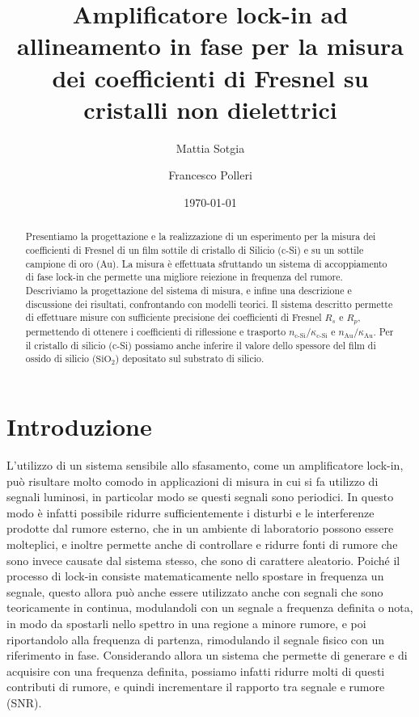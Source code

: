 \documentclass[prb,showpacs,floatfix,altaffilletter,amsmath,amssymb,reprint,citeautoscript,showkeys]{revtex4-1}
\begin{document}
\title{Amplificatore lock-in ad allineamento in fase per la misura dei coefficienti di Fresnel su cristalli non dielettrici}
\author{Mattia Sotgia}
\author{Francesco Polleri}
\date{\today}

\begin{abstract}
    Presentiamo la progettazione e la realizzazione di un esperimento per la misura dei coefficienti di Fresnel di un film sottile di cristallo di Silicio (c-Si) e su un sottile campione di oro (Au). La misura è effettuata sfruttando un sistema di accoppiamento di fase lock-in\cite{scofieldFrequencydomainDescriptionLockin1994} che permette una migliore reiezione in frequenza del rumore. Descriviamo la progettazione del sistema di misura, e infine una descrizione e discussione dei risultati, confrontando con modelli teorici. Il sistema descritto permette di effettuare misure con sufficiente precisione dei coefficienti di Fresnel $R_s$ e $R_p$, permettendo di ottenere i coefficienti di riflessione e trasporto $n_\text{c-Si}/\kappa_\text{c-Si}$ e $n_\text{Au}/\kappa_\text{Au}$. Per il cristallo di silicio (c-Si) possiamo anche inferire il valore dello spessore del film di ossido di silicio ($\mathrm{SiO_2}$) depositato sul substrato di silicio.
\end{abstract}
\maketitle

\section{Introduzione} 

L'utilizzo di un sistema sensibile allo sfasamento, come un amplificatore lock-in, può risultare molto comodo in applicazioni di misura in cui si fa utilizzo di segnali luminosi, in particolar modo se questi segnali sono periodici. In questo modo è infatti possibile ridurre sufficientemente i disturbi e le interferenze prodotte dal rumore esterno, che in un ambiente di laboratorio possono essere molteplici, e inoltre permette anche di controllare e ridurre fonti di rumore che sono invece causate dal sistema stesso, che sono di carattere aleatorio. Poiché il processo di lock-in consiste matematicamente nello spostare in frequenza un segnale, questo allora può anche essere utilizzato anche con segnali che sono teoricamente in continua, modulandoli con un segnale a frequenza definita o nota, in modo da spostarli nello spettro in una regione a minore rumore, e poi riportandolo alla frequenza di partenza, rimodulando il segnale fisico con un riferimento in fase. Considerando allora un sistema che permette di generare e di acquisire con una frequenza definita, possiamo infatti ridurre molti di questi contributi di rumore, e quindi incrementare il rapporto tra segnale e rumore (SNR). 
\end{document}
